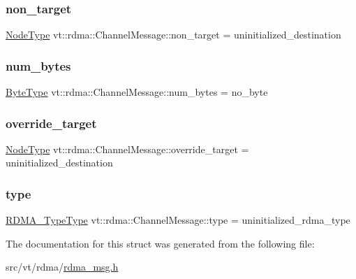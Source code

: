 \subsubsection{\texorpdfstring{non\+\_\+target}{non\_target}}
{\footnotesize\ttfamily \hyperlink{namespacevt_a866da9d0efc19c0a1ce79e9e492f47e2}{Node\+Type} vt\+::rdma\+::\+Channel\+Message\+::non\+\_\+target = uninitialized\+\_\+destination}

\mbox{\label{structvt_1_1rdma_1_1_channel_message_ae6eacd8bc1177ce518f8cf061163a9e5}} 
\subsubsection{\texorpdfstring{num\+\_\+bytes}{num\_bytes}}
{\footnotesize\ttfamily \hyperlink{namespacevt_aab8d55968084610ce3b17057981e9300}{Byte\+Type} vt\+::rdma\+::\+Channel\+Message\+::num\+\_\+bytes = no\+\_\+byte}

\mbox{\label{structvt_1_1rdma_1_1_channel_message_a6becb5011a81e9e52210f075406f848c}} 
\subsubsection{\texorpdfstring{override\+\_\+target}{override\_target}}
{\footnotesize\ttfamily \hyperlink{namespacevt_a866da9d0efc19c0a1ce79e9e492f47e2}{Node\+Type} vt\+::rdma\+::\+Channel\+Message\+::override\+\_\+target = uninitialized\+\_\+destination}

\mbox{\label{structvt_1_1rdma_1_1_channel_message_a325d169e844b5de16a885852841ec25a}} 
\subsubsection{\texorpdfstring{type}{type}}
{\footnotesize\ttfamily \hyperlink{namespacevt_1_1rdma_ac848e1d9da43db6294bd06f83e5d3946}{R\+D\+M\+A\+\_\+\+Type\+Type} vt\+::rdma\+::\+Channel\+Message\+::type = uninitialized\+\_\+rdma\+\_\+type}



The documentation for this struct was generated from the following file\+:\begin{DoxyCompactItemize}
\item 
src/vt/rdma/\hyperlink{rdma__msg_8h}{rdma\+\_\+msg.\+h}\end{DoxyCompactItemize}
